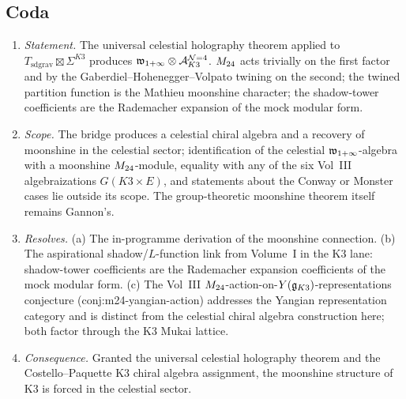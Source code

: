 \subsection*{Coda}

\begin{enumerate}
\item \emph{Statement.} The universal
celestial holography theorem applied to $T_{\mathrm{sd grav}} \boxtimes \Sigma^{K3}$
produces $\mathfrak w_{1+\infty} \otimes \mathcal A^{\mathcal{N}{=}4}_{K3}$. $M_{24}$ acts
trivially on the first factor and by the Gaberdiel--Hohenegger--Volpato
twining on the second; the twined partition function is the Mathieu
moonshine character; the shadow-tower coefficients are the Rademacher
expansion of the mock modular form.

\item \emph{Scope.} The bridge produces a celestial chiral algebra and
a recovery of moonshine in the celestial sector; identification of the
celestial $\mathfrak w_{1+\infty}$-algebra with a moonshine $M_{24}$-module, equality
with any of the six Vol~III algebraizations
$G(K3 \times E)$, and statements about the Conway or Monster cases lie
outside its scope. The group-theoretic moonshine theorem itself
remains Gannon's.

\item \emph{Resolves.}
(a) The in-programme derivation of the moonshine connection.
(b) The aspirational shadow/$L$-function link from Volume~I in the
K3 lane: shadow-tower coefficients are the Rademacher expansion
coefficients of the mock modular form.
(c) The Vol~III $M_{24}$-action-on-$Y(\mathfrak g_{K3})$-representations
conjecture (conj:m24-yangian-action) addresses the Yangian
representation category and is distinct from the celestial chiral
algebra construction here; both factor through the K3 Mukai lattice.

\item \emph{Consequence.} Granted the universal celestial
holography theorem and the Costello--Paquette K3 chiral algebra
assignment, the moonshine structure of K3 is forced in the
celestial sector.
\end{enumerate}

